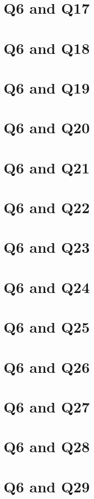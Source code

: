 \documentclass{report}
\begin{document}
\section{Q6 and Q17}\clearpage
\section{Q6 and Q18}\clearpage
\section{Q6 and Q19}\clearpage
\section{Q6 and Q20}\clearpage
\section{Q6 and Q21}\clearpage
\section{Q6 and Q22}\clearpage
\section{Q6 and Q23}\clearpage
\section{Q6 and Q24}\clearpage
\section{Q6 and Q25}\clearpage
\section{Q6 and Q26}\clearpage
\section{Q6 and Q27}\clearpage
\section{Q6 and Q28}\clearpage
\section{Q6 and Q29}\clearpage
\end{document}
